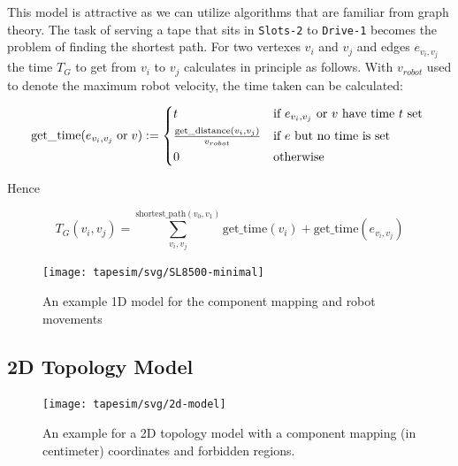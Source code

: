 \documentclass{../../template/esiwace-report}
\begin{document}
This model is attractive as we can utilize algorithms that are familiar from
graph theory.
The task of serving a tape that sits in \texttt{Slots-2} to \texttt{Drive-1} becomes the problem of finding the shortest path. %
%
%
For two vertexes $v_i$ and $v_j$ and edges $e_{v_i, v_j}$ the time $T_G$ to get from $v_i$ to $v_j$ calculates in principle as follows. With 
 $v_{robot}$ used to denote the maximum robot velocity, the time taken can be calculated:

\begin{equation}
\text{get\_time}(e_{v_i, v_j}\;\text{or}\;v) :=
\begin{cases*}
t & if $e_{v_i, v_j}$ or $v$ have time $t$ set \\
\frac{\text{get\_distance}(v_i, v_j)}{v_{robot}} & if $e$ but no time is set \\
0 & otherwise
\end{cases*}
\end{equation}

Hence

\begin{equation}
T_{G}(v_i, v_j) = \sum^{\text{shortest\_path}(v_0, v_1)}_{v_{i}, v_{j}}
\text{get\_time}(v_i) + \text{get\_time}(e_{v_i, v_j})
\end{equation}



\begin{figure} [h]
	\centering
	\texttt{[image: tapesim/svg/SL8500-minimal]}
	\caption{An example 1D model for the component mapping and robot movements}
	\label{fig:sl8500}
\end{figure}




\subsection{2D Topology Model}
\label{sec:tapesim/2d topology}



\begin{figure}[h]
	\centering
	\texttt{[image: tapesim/svg/2d-model]}
	\caption[Example: 2D Topology]{An example for a 2D topology model with a component mapping (in centimeter) coordinates and forbidden regions.}
	\label{fig:2D topology}
\end{figure}
\end{document}
